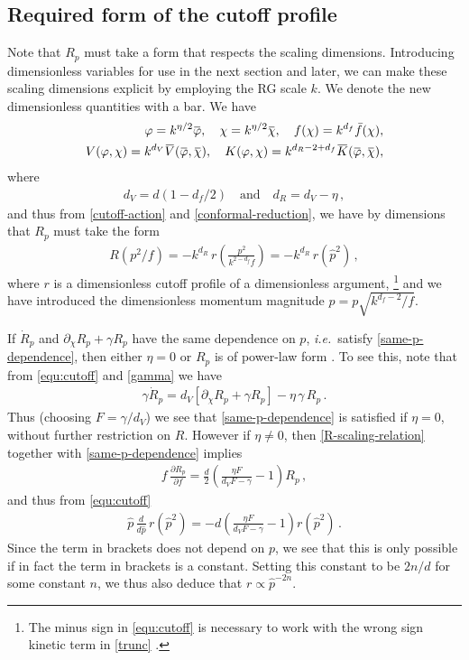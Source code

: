 \documentclass[11pt]{book}
\newcommand{\overbar}[1]{\mkern 1.5mu\overline{\mkern-1.5mu#1\mkern-1.5mu}\mkern 1.5mu}
\newcommand{\bV}{\overbar V}
\newcommand{\bK}{\overbar K}
\newcommand{\bp}{\overbar \varphi}
\newcommand{\bc}{\overbar \chi}
\newcommand\ie{\textit{i.e.}\ }
\numberwithin{equation}{chapter}
\begin{document}
\subsection{Required form of the cutoff profile}\label{sec:required-cutoff}

Note that $R_p$ must take a form that respects the scaling dimensions.
Introducing dimensionless variables for use in the next section and later,
we can make these scaling dimensions explicit by employing the RG scale $k$.
We denote the new dimensionless quantities with a bar. We have
\begin{align}
  \label{dim-vars}
  \varphi = k^{\eta/2} \bp,
  \quad
  \chi = k^{\eta/2} \bc,
  \quad
  f(\chi) = k^{d_f} \bar f(\chi),\nonumber\\
  V(\varphi,\chi) = k^{d_V} \bV (\bp,\bc),
  \quad
  K(\varphi, \chi) = k^{d_R- 2 + d_f} \bK (\bp,\bc),
\end{align}
where
\begin{align}
  \label{dimensions}
  d_V = d(1-d_f/2)
  \quad \text{and} \quad
  d_R = d_V - \eta\,,
\end{align}
and thus from \eqref{cutoff-action} and \eqref{conformal-reduction},
we have by dimensions that $R_p$ must take the form
\begin{align}
  \label{equ:cutoff}
  R(p^2/f)= - k^{d_R} \,r\left(\frac{p^2}{k^{2-d_f}f}\right) = - k^{d_R} \,r(\hat p^2) \,,
\end{align}
where $r$ is a dimensionless cutoff profile of a dimensionless argument,%
\footnote{The minus sign in \eqref{equ:cutoff} is necessary to work with the wrong sign kinetic
term in \eqref{trunc} \cite{Dietz:2015owa}.}
and we have introduced the dimensionless momentum magnitude $\hat p = p\sqrt{k^{d_f-2}/f}$.

If $\dot R_p$ and $\partial_{\chi} R_p + \gamma R_p$ have the same dependence on $p$,
\ie satisfy \eqref{same-p-dependence}, then either $\eta=0$ or $R_p$ is of power-law form \cite{Dietz:2015owa}.
To see this, note that from \eqref{equ:cutoff} and \eqref{gamma} we have
\begin{align}
\label{R-scaling-relation}
\gamma {\dot R}_p = d_V \left[\partial_\chi R_p+\gamma R_p\right] - \eta \, \gamma \, R_p\,.
\end{align}
Thus (choosing $F=\gamma/d_V$) we see that \eqref{same-p-dependence} is satisfied if $\eta=0$,
without further restriction on $R$. However if $\eta\ne0$,
then \eqref{R-scaling-relation} together with \eqref{same-p-dependence} implies
\begin{align}
f \, \frac{\partial R_p}{\partial f} = \frac{d}{2}\left( \frac{\eta F}{ d_VF- \gamma} - 1\right) R_p\,,
\end{align}
and thus from \eqref{equ:cutoff}
\begin{align}
\hat{p} \, \frac{d}{d\hat{p}} \, r(\hat{p}^2) = -d\left( \frac{\eta F}{ d_VF- \gamma} - 1\right) r(\hat{p}^2)\,.
\end{align}
Since the term in brackets does not depend on $p$,
we see that this is only possible if in fact the term in brackets is a constant.
Setting this constant to be $2n/d$ for some constant $n$, we thus also deduce that $r\propto \hat{p}^{-2n}$.
\end{document}
